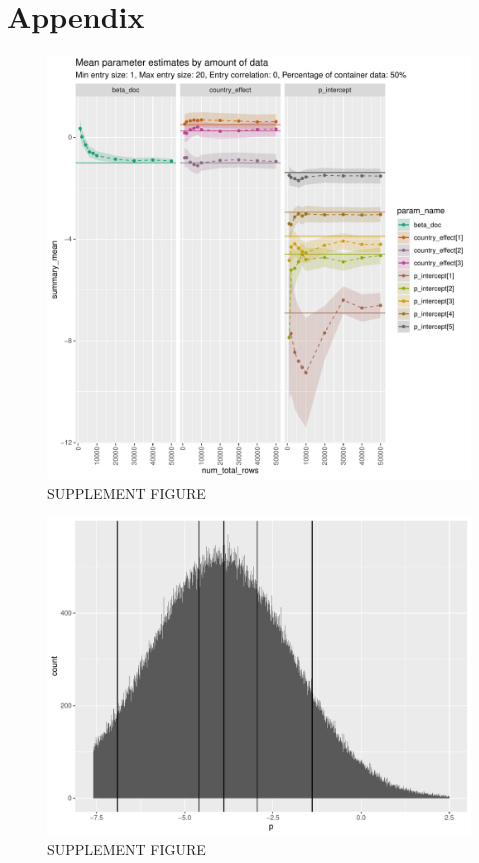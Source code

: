 \documentclass{article}
\begin{document}
\section{Appendix}


\begin{figure}[h!]
\includegraphics[width=\textwidth]{../visualisations/figures/simulation_estimates.pdf}
\caption{SUPPLEMENT FIGURE}
\label{fig:simulation_estimation}
\end{figure}


\begin{figure}[h!]
\includegraphics[width=\textwidth]{../visualisations/figures/pint_prior.pdf}
\caption{SUPPLEMENT FIGURE}
\label{fig:p_int_prior}
\end{figure}
\end{document}
